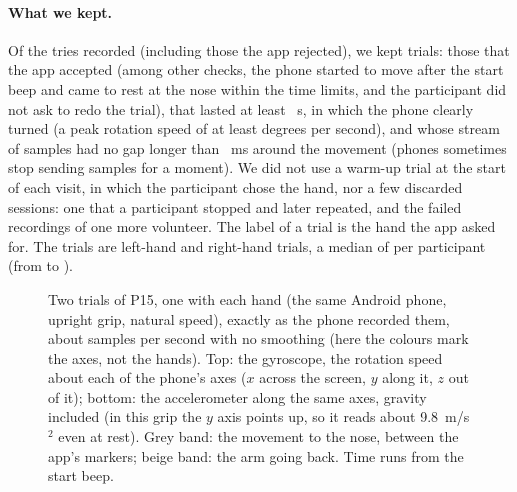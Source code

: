 \paragraph{What we kept.} Of the  tries recorded (including those the app rejected), we
kept  trials: those that the app accepted (among other checks, the phone
started to move after the start beep and came to rest at the nose within the time limits, and the participant did
not ask to redo the trial), that lasted at least ~s, in which the phone clearly turned (a
peak rotation speed of at least  degrees per second), and whose stream of samples had no
gap longer than ~ms around the movement (phones sometimes stop sending samples for a moment).
We did not use a warm-up trial at the start of each visit, in which the participant chose the hand, nor a few
discarded sessions: one that a participant stopped and later repeated, and the failed recordings of one more
volunteer. The label of a trial is the hand the app asked for. The  trials are
 left-hand and  right-hand trials, a median of
 per participant (from  to
).

\begin{figure}[tbp]
\centering
\begin{minipage}[c]{0.49\linewidth}\centering{}\end{minipage}\hfill
\begin{minipage}[c]{0.48\linewidth}
\caption{Two trials of P15, one with each hand (the same Android phone, upright grip, natural speed), exactly as
the phone recorded them, about  samples per second with no smoothing (here the
colours mark the axes, not the hands). Top: the gyroscope,
the rotation speed about each of the phone's axes ($x$ across the screen, $y$ along it, $z$ out of it); bottom: the
accelerometer along the same axes, gravity included (in this grip the $y$ axis points up, so it reads about
9.8~m/s$^2$ even at rest). Grey band: the movement to the nose,
between the app's markers; beige band: the arm going back. Time runs from the start beep.}
\label{fig:raw}
\end{minipage}
\end{figure}


